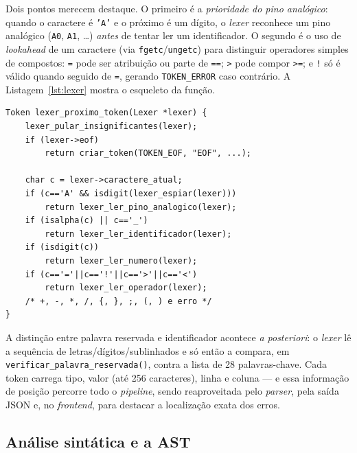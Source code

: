 \documentclass[conference]{IEEEtran}
\begin{document}
Dois pontos merecem destaque. O primeiro é a \emph{prioridade do pino
analógico}: quando o caractere é \texttt{'A'} e o próximo é um dígito, o
\emph{lexer} reconhece um pino analógico (\texttt{A0}, \texttt{A1}, \dots)
\emph{antes} de tentar ler um identificador. O segundo é o uso de
\emph{lookahead} de um caractere (via \texttt{fgetc}/\texttt{ungetc}) para
distinguir operadores simples de compostos: \texttt{=} pode ser atribuição
ou parte de \texttt{==}; \texttt{>} pode compor \texttt{>=}; e \texttt{!}
só é válido quando seguido de \texttt{=}, gerando \texttt{TOKEN\_ERROR}
caso contrário. A Listagem~\ref{lst:lexer} mostra o esqueleto da função.

\begin{lstlisting}[style=csmall,caption={Despacho principal do lexer.},label={lst:lexer}]
Token lexer_proximo_token(Lexer *lexer) {
    lexer_pular_insignificantes(lexer);
    if (lexer->eof)
        return criar_token(TOKEN_EOF, "EOF", ...);

    char c = lexer->caractere_atual;
    if (c=='A' && isdigit(lexer_espiar(lexer)))
        return lexer_ler_pino_analogico(lexer);
    if (isalpha(c) || c=='_')
        return lexer_ler_identificador(lexer);
    if (isdigit(c))
        return lexer_ler_numero(lexer);
    if (c=='='||c=='!'||c=='>'||c=='<')
        return lexer_ler_operador(lexer);
    /* +, -, *, /, {, }, ;, (, ) e erro */
}
\end{lstlisting}

A distinção entre palavra reservada e identificador acontece \emph{a
posteriori}: o \emph{lexer} lê a sequência de letras/dígitos/sublinhados e
só então a compara, em \texttt{verificar\_palavra\_reservada()}, contra a
lista de 28 palavras-chave. Cada token carrega tipo, valor (até 256
caracteres), linha e coluna --- e essa informação de posição percorre todo
o \emph{pipeline}, sendo reaproveitada pelo \emph{parser}, pela saída JSON
e, no \emph{frontend}, para destacar a localização exata dos erros.

\subsection{Análise sintática e a AST}
\end{document}
